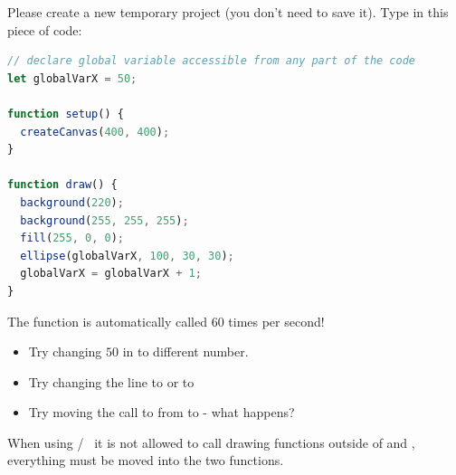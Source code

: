 \newpage
{}
\begin{exercisebox}[adjusted title= Animation and Functions]%

Please create a new temporary project (you don't need to save it). Type in
this piece of code:

\begin{lstlisting}[language=JavaScript]
// declare global variable accessible from any part of the code
let globalVarX = 50;

function setup() {
  createCanvas(400, 400);
}

function draw() {
  background(220);
  background(255, 255, 255);
  fill(255, 0, 0);
  ellipse(globalVarX, 100, 30, 30);
  globalVarX = globalVarX + 1;
}

\end{lstlisting}

\noindent
The  function is automatically called 60 times per second!

\begin{itemize}
\item Try changing  $50$ in  to different number.
\item Try changing the line  to  or to 
\item Try moving the call to  from 
  to  - what happens?
\end{itemize}


When using
/~ it is not allowed to call
drawing functions outside of  and
, everything must be moved into the two functions.

\end{exercisebox}

